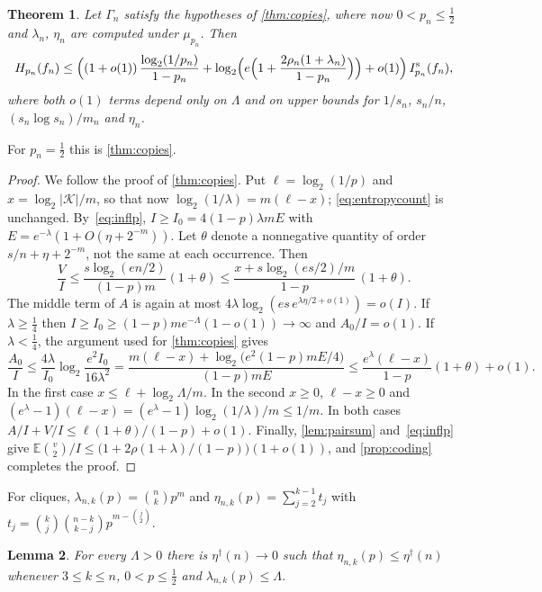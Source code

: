 \documentclass[11pt]{amsart}
\newtheorem{theorem}{Theorem}[section]
\newtheorem{lemma}[theorem]{Lemma}
\theoremstyle{remark}
\newcommand{\E}{\mathbb{E}}
\newcommand{\K}{\mathcal K}
\begin{document}
\begin{theorem}\label{thm:copiesp}
Let $\Gamma_n$ satisfy the hypotheses of \cref{thm:copies}, where now $0<p_n\le\frac12$ and $\lambda_n$, $\eta_n$ are
computed under $\mu_{p_n}$. Then
\[
H_{p_n}(f_n)\le\Bigl((1+o(1))\,\frac{\log_2(1/p_n)}{1-p_n}
+\log_2\Bigl(e\Bigl(1+\frac{2\rho_n(1+\lambda_n)}{1-p_n}\Bigr)\Bigr)+o(1)\Bigr)\,I^{\mathrm s}_{p_n}(f_n),
\]
where both $o(1)$ terms depend only on $\Lambda$ and on upper bounds for $1/s_n$, $s_n/n$, $(s_n\log s_n)/m_n$ and
$\eta_n$.
\end{theorem}

For $p_n=\frac12$ this is \cref{thm:copies}.

\begin{proof}
We follow the proof of \cref{thm:copies}. Put $\ell=\log_2(1/p)$ and $x=\log_2|\K|/m$, so that now
$\log_2(1/\lambda)=m(\ell-x)$; \eqref{eq:entropycount} is unchanged. By~\eqref{eq:inflp}, $I\ge I_0=4(1-p)\lambda mE$
with $E=e^{-\lambda}(1+O(\eta+2^{-m}))$. Let $\theta$ denote a nonnegative quantity of order $s/n+\eta+2^{-m}$, not the
same at each occurrence. Then
\[
\frac VI\le\frac{s\log_2(en/2)}{(1-p)m}(1+\theta)\le\frac{x+s\log_2(es/2)/m}{1-p}\,(1+\theta).
\]
The middle term of $A$ is again at most $4\lambda\log_2(es\,e^{\lambda\eta/2+o(1)})=o(I)$. If $\lambda\ge\frac14$ then
$I\ge I_0\ge(1-p)me^{-\Lambda}(1-o(1))\to\infty$ and $A_0/I=o(1)$. If $\lambda<\frac14$, the argument used for
\cref{thm:copies} gives
\[
\frac{A_0}I\le\frac{4\lambda}{I_0}\log_2\frac{e^2I_0}{16\lambda^2}
=\frac{m(\ell-x)+\log_2\bigl(e^2(1-p)mE/4\bigr)}{(1-p)mE}\le\frac{e^\lambda(\ell-x)}{1-p}(1+\theta)+o(1).
\]
In the first case $x\le\ell+\log_2\Lambda/m$. In the second $x\ge0$, $\ell-x\ge0$ and
$(e^\lambda-1)(\ell-x)=(e^\lambda-1)\log_2(1/\lambda)/m\le1/m$. In both cases
$A/I+V/I\le\ell(1+\theta)/(1-p)+o(1)$. Finally, \cref{lem:pairsum} and~\eqref{eq:inflp} give
$\E\binom v2/I\le\bigl(1+2\rho(1+\lambda)/(1-p)\bigr)(1+o(1))$, and \cref{prop:coding} completes the proof.
\end{proof}

For cliques, $\lambda_{n,k}(p)=\binom nkp^m$ and $\eta_{n,k}(p)=\sum_{j=2}^{k-1}t_j$ with
$t_j=\binom kj\binom{n-k}{k-j}p^{m-\binom j2}$.

\begin{lemma}\label{lem:rangep}
For every $\Lambda>0$ there is $\eta^\dagger(n)\to0$ such that $\eta_{n,k}(p)\le\eta^\dagger(n)$ whenever $3\le k\le n$,
$0<p\le\frac12$ and $\lambda_{n,k}(p)\le\Lambda$.
\end{lemma}
\end{document}
